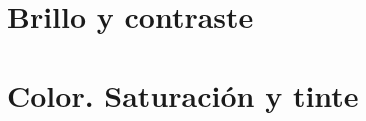 \documentclass[a4paper]{book}
\begin{document}
\section{Brillo y contraste}
\section{Color. Saturación y tinte}


% 
\end{document}
